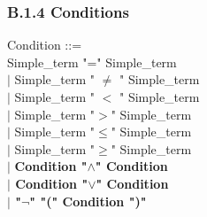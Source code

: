 \documentclass[12pt,a4paper,draft]{article}
\begin{document}
\subsubsection{B.1.4 Conditions }
\footnotesize{
\begin{sloppypar} 

Condition ::= \\
\hspace*{0.20in}   Simple\_term  "="  Simple\_term\\
\hspace*{0.20in} $|$  Simple\_term  " $\ne$  "  Simple\_term\\
\hspace*{0.20in} $|$  Simple\_term  " $<$  "  Simple\_term  \\
\hspace*{0.20in} $|$  Simple\_term  "$>$"  Simple\_term  \\
\hspace*{0.20in} $|$  Simple\_term  "$\leq$"  Simple\_term\\
\hspace*{0.20in} $|$  Simple\_term  "$\geq$"  Simple\_term\\
\hspace*{0.20in} $|$ \textbf{ Condition  "$\land$"  Condition\\
\hspace*{0.20in} $|$  Condition  "$\lor$"  Condition\\
\hspace*{0.20in} $|$ "$\neg$" "(" Condition ")"} \\
 

\end{sloppypar}}
\end{document}
